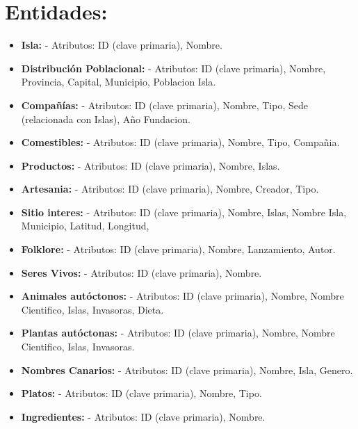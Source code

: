 \documentclass[11pt]{report}
\begin{document}
\section{Entidades:}
\begin{itemize}
    \item \textbf{Isla:}
    \subitem - Atributos: ID (clave primaria), Nombre.
    
    \item \textbf{Distribución Poblacional:}
    \subitem - Atributos: ID (clave primaria), Nombre, Provincia, Capital, Municipio, Poblacion Isla.
    
    \item \textbf{Compañías:}
    \subitem - Atributos: ID (clave primaria), Nombre, Tipo, Sede (relacionada con Islas), Año Fundacion.

    \item \textbf{Comestibles:}
    \subitem - Atributos: ID (clave primaria), Nombre, Tipo, Compañia.

    \item \textbf{Productos:}
    \subitem - Atributos: ID (clave primaria), Nombre, Islas.

    \item \textbf{Artesania:}
    \subitem - Atributos: ID (clave primaria), Nombre, Creador, Tipo.
    
    \item \textbf{Sitio interes:}
    \subitem - Atributos: ID (clave primaria), Nombre, Islas, Nombre Isla, Municipio, Latitud, Longitud,

    \item \textbf{Folklore:}
    \subitem - Atributos: ID (clave primaria), Nombre, Lanzamiento, Autor.

    \item \textbf{Seres Vivos:}
    \subitem - Atributos: ID (clave primaria), Nombre.
    
    \item \textbf{Animales autóctonos:}
    \subitem - Atributos: ID (clave primaria), Nombre, Nombre Cientifico, Islas, Invasoras, Dieta.

    \item \textbf{Plantas autóctonas:}
    \subitem - Atributos: ID (clave primaria), Nombre, Nombre Cientifico, Islas, Invasoras.

    \item \textbf{Nombres Canarios:}
    \subitem - Atributos: ID (clave primaria), Nombre, Isla, Genero.

    \item \textbf{Platos:}
    \subitem - Atributos: ID (clave primaria), Nombre, Tipo.

    \item \textbf{Ingredientes:}
    \subitem - Atributos: ID (clave primaria), Nombre.
\end{itemize}
\end{document}
